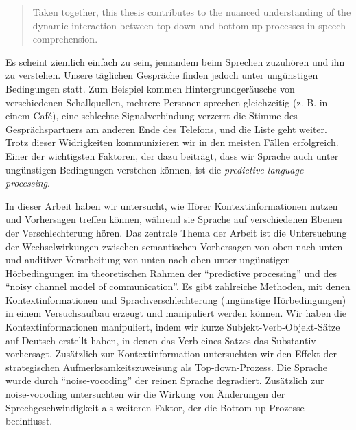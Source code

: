 \documentclass[a4paper, nobind]{templates/ociamthesis}
\begin{document}
\begin{romanpages}
\begin{abstract}
Taken together, this thesis contributes to the nuanced understanding of the dynamic interaction between top-down and bottom-up processes in speech comprehension.
\end{abstract}




\renewcommand{\abstractsecondtitle}{Zusammenfassung}
\begin{abstractsecond}
	Es scheint ziemlich einfach zu sein, jemandem beim Sprechen zuzuhören und ihn zu verstehen. Unsere täglichen Gespräche finden jedoch unter ungünstigen Bedingungen statt. Zum Beispiel kommen Hintergrundgeräusche von verschiedenen Schallquellen, mehrere Personen sprechen gleichzeitig (z. B. in einem Café), eine schlechte Signalverbindung verzerrt die Stimme des Gesprächspartners am anderen Ende des Telefons, und die Liste geht weiter. Trotz dieser Widrigkeiten kommunizieren wir in den meisten Fällen erfolgreich. Einer der wichtigsten Faktoren, der dazu beiträgt, dass wir Sprache auch unter ungünstigen Bedingungen verstehen können, ist die \emph{predictive language processing}.

In dieser Arbeit haben wir untersucht, wie Hörer Kontextinformationen nutzen und Vorhersagen treffen können, während sie Sprache auf verschiedenen Ebenen der Verschlechterung hören. Das zentrale Thema der Arbeit ist die Untersuchung der Wechselwirkungen zwischen semantischen Vorhersagen von oben nach unten und auditiver Verarbeitung von unten nach oben unter ungünstigen Hörbedingungen im theoretischen Rahmen der ``predictive processing'' und des ``noisy channel model of communication''. Es gibt zahlreiche Methoden, mit denen Kontextinformationen und Sprachverschlechterung (ungünstige Hörbedingungen) in einem Versuchsaufbau erzeugt und manipuliert werden können. Wir haben die Kontextinformationen manipuliert, indem wir kurze Subjekt-Verb-Objekt-Sätze auf Deutsch erstellt haben, in denen das Verb eines Satzes das Substantiv vorhersagt. Zusätzlich zur Kontextinformation untersuchten wir den Effekt der strategischen Aufmerksamkeitszuweisung als Top-down-Prozess. Die Sprache wurde durch ``noise-vocoding'' der reinen Sprache degradiert. Zusätzlich zur noise-vocoding untersuchten wir die Wirkung von Änderungen der Sprechgeschwindigkeit als weiteren Faktor, der die Bottom-up-Prozesse beeinflusst.


\end{abstractsecond}
\end{romanpages}
\end{document}
